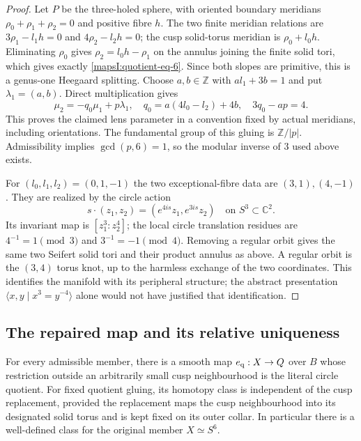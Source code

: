 \begin{proof}
Let $P$ be the three-holed sphere, with oriented boundary
meridians $\rho_0+\rho_1+\rho_2=0$ and positive fibre $h$.
The two finite meridian relations are
$3\rho_1-l_1h=0$ and $4\rho_2-l_2h=0$; the cusp solid-torus
meridian is $\rho_0+l_0h$.  Eliminating $\rho_0$ gives
$\rho_2=l_0h-\rho_1$ on the annulus joining the finite solid
tori, which gives exactly \eqref{mapsI:quotient-eq-6}.  Since both slopes are
primitive, this is a genus-one Heegaard splitting.  Choose
$a,b\in\mathbb Z$ with $al_1+3b=1$ and put
$\lambda_1=(a,b)$.  Direct multiplication gives
\[
 \mu_2=-q_0\mu_1+p\lambda_1,
 \quad q_0=a(4l_0-l_2)+4b,
 \quad 3q_0-ap=4.
 \label{mapsI:quotient-eq-7}
\]
This proves the claimed lens parameter in a convention fixed
by actual meridians, including orientations.  The fundamental
group of this gluing is $\mathbb Z/|p|$.  Admissibility implies
$\gcd(p,6)=1$, so the modular inverse of $3$ used above exists.

For $(l_0,l_1,l_2)=(0,1,-1)$ the two exceptional-fibre data
are $(3,1),(4,-1)$.  They are realized by the circle action
\[
 s\cdot(z_1,z_2)=(e^{4is}z_1,e^{3is}z_2)
 \quad\text{on } S^3\subset\mathbb C^2.
\]
Its invariant map is $[z_1^3:z_2^4]$; the local circle
translation residues are $4^{-1}=1\pmod3$ and
$3^{-1}=-1\pmod4$.  Removing a regular orbit gives the
same two Seifert solid tori and their product annulus as
above.  A regular orbit is the $(3,4)$ torus knot, up to
the harmless exchange of the two coordinates.  This
identifies the manifold with its peripheral structure;
the abstract presentation $\langle x,y\mid x^3=y^{-4}\rangle$
alone would not have justified that identification.
\end{proof}

\subsection{The repaired map and its relative uniqueness}

\begin{theorem}\label{mapsI:src:A.2.1}
For every admissible member, there is a smooth map
$e_{\rm q}:X\to Q$ over $B$ whose restriction outside an arbitrarily
small cusp neighbourhood is the literal circle quotient.
For fixed quotient gluing, its homotopy class is independent
of the cusp replacement, provided the replacement maps the
cusp neighbourhood into its designated solid torus and is
kept fixed on its outer collar.  In particular there is a
well-defined class for the original member $X\simeq S^6$.
\end{theorem}

